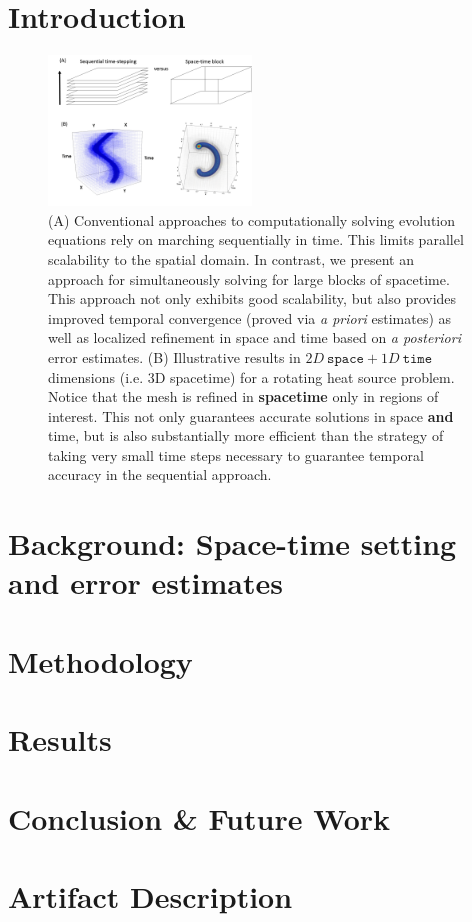 \documentclass[sigconf]{acmart}
\begin{document}
\section{Introduction}
\label{sec:intro}
\begin{figure}
  \includegraphics[width=0.48\textwidth]{figs/Picture2.png}
  \caption{\label{fig:Overview} {\small (A) Conventional approaches to computationally solving evolution equations rely on marching sequentially in time. This limits parallel scalability to the spatial domain. In contrast, we present an approach for simultaneously solving for large blocks of spacetime. This approach not only exhibits good scalability, but also provides improved temporal convergence (proved via {\it a priori} estimates) as well as localized refinement in space and time based on  {\it a posteriori} error estimates. (B) Illustrative results in $2D~\texttt{space} + 1D ~\texttt{time}$ dimensions (i.e. 3D spacetime) for a rotating heat source problem. Notice that the mesh is refined in {\bf spacetime} only in regions of interest. This not only guarantees accurate solutions in space {\bf and} time, but is also substantially more efficient than the strategy of taking very small time steps  necessary to guarantee temporal accuracy in the sequential approach.}}
\end{figure}



\section{Background: Space-time setting and error estimates}
\label{sec:background}



\section{Methodology}
\label{sec:methodology}


\section{Results}
\label{sec:Results}



\section{Conclusion \& Future Work}
\label{sec:conclusion}





\newpage

\section{Artifact Description}

\end{document}
